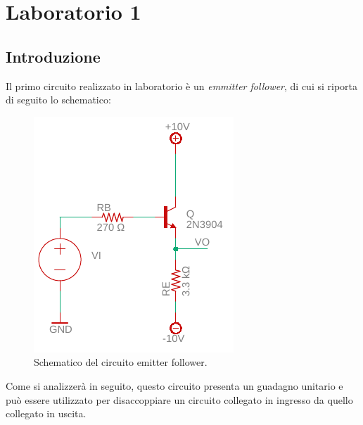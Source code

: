 \chapter{Laboratorio 1}
\section{Introduzione}
Il primo circuito realizzato in laboratorio è un \textit{emmitter follower}, di cui si riporta di seguito lo schematico:
\begin{figure}[h!]
	\centering
	\includegraphics[width=0.4\linewidth]{./OtherFiles/Laboratorio 1/emitter follower}
	\caption{Schematico del circuito emitter follower.}
	\label{fig:emitterfollwer}
\end{figure}

\noindent
Come si analizzerà in seguito, questo circuito presenta un guadagno unitario e può essere utilizzato per disaccoppiare un circuito collegato in ingresso da quello collegato in uscita.

